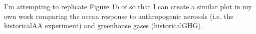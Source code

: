 I'm attempting to replicate Figure 1b of \citet{Nummelin_2017} so that I can create a similar plot in my own work comparing the ocean response to anthropogenic aerosols (i.e. the historicalAA experiment) and greenhouse gases (historicalGHG). 
